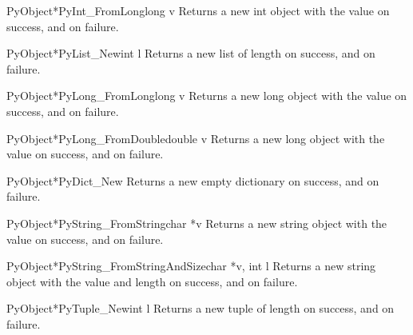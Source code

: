      \begin{cfuncdesc}{PyObject*}{PyInt_FromLong}{long v}
	 Returns a new int object with the value  on success, and
	 {\NULL} on failure.
     \end{cfuncdesc}

     \begin{cfuncdesc}{PyObject*}{PyList_New}{int l}
	 Returns a new list of length  on success, and {\NULL} on
	 failure.
     \end{cfuncdesc}

     \begin{cfuncdesc}{PyObject*}{PyLong_FromLong}{long v}
	 Returns a new long object with the value  on success, and
	 {\NULL} on failure.
     \end{cfuncdesc}

     \begin{cfuncdesc}{PyObject*}{PyLong_FromDouble}{double v}
	 Returns a new long object with the value  on success, and
	 {\NULL} on failure.
     \end{cfuncdesc}

     \begin{cfuncdesc}{PyObject*}{PyDict_New}{}
	 Returns a new empty dictionary on success, and {\NULL} on
	 failure.
     \end{cfuncdesc}

     \begin{cfuncdesc}{PyObject*}{PyString_FromString}{char *v}
	 Returns a new string object with the value  on success, and
	 {\NULL} on failure.
     \end{cfuncdesc}

     \begin{cfuncdesc}{PyObject*}{PyString_FromStringAndSize}{char *v, int l}
	 Returns a new string object with the value  and length 
	 on success, and {\NULL} on failure.
     \end{cfuncdesc}

     \begin{cfuncdesc}{PyObject*}{PyTuple_New}{int l}
	 Returns a new tuple of length  on success, and {\NULL} on
	 failure.
     \end{cfuncdesc}

